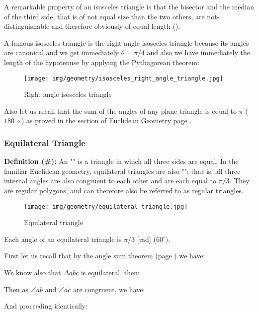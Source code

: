 {	A remarkable property of an isosceles triangle is that the bisector and the median of the third side, that is of not equal size than the two others, are not-distinguishable and therefore obviously of equal length ().
	
	A famous isosceles triangle is the right angle isosceles triangle because its angles are canonical and we get immediately $\theta=\pi/4$ and also we have immediately the length of the hypotenuse by applying the Pythagorean theorem:
	\begin{figure}[H]
		\centering
		\texttt{[image: img/geometry/isosceles\_right\_angle\_triangle.jpg]}
		\caption{Right angle isosceles triangle}
	\end{figure}
	Also let us recall that the sum of the angles of any plane triangle is equal to $\pi$ ($180^.\circ$) as proved in the section of Euclidean Geometry page \pageref{angle sum theorem}.
	
	\pagebreak
	\subsubsection{Equilateral Triangle}\label{lateral triangle}
	\textbf{Definition (\#\mydef):} An "" is a triangle in which all three sides are equal. In the familiar Euclidean geometry, equilateral triangles are also ""; that is, all three internal angles are also congruent to each other and are each equal to $\pi/3$. They are regular polygons, and can therefore also be referred to as regular triangles.
	\begin{figure}[H]
		\centering
		\texttt{[image: img/geometry/equilateral\_triangle.jpg]}
		\caption{Equilateral triangle}
	\end{figure}
	\begin{theorem}
	Each angle of an equilateral triangle is $\pi/3$ [rad] ($60^\circ$).
	\end{theorem}
	\begin{dem}
	First let us recall that by the angle sum theorem (page \pageref{angle sum theorem}) we have:
	
	We know also that $\Delta abc$ is equilateral, then:
	
	Then as $\angle\overline{ab}$ and $\angle\overline{ac}$ are congruent, we have:
	
	And proceeding identically:
	

\end{dem}}
